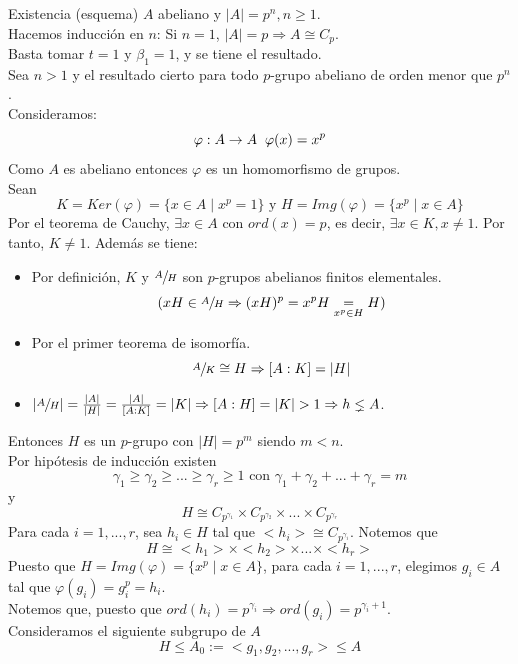 \documentclass[11pt,a4paper]{article}
\begin{document}
\begin{enumerate*}
\item[Existencia (esquema)] $A$ abeliano y $|A| = p^{n}, n \geq 1$. \\
Hacemos inducción en $n$: Si $n = 1$, $|A| = p \Rightarrow A \cong C_{p}$. \\
Basta tomar $t = 1$ y $\beta_{1} = 1$, y se tiene el resultado. \\
Sea $n > 1$ y el resultado cierto para todo $p$-grupo abeliano de orden menor que $p^{n}$. \\
Consideramos:
$$\varphi: A \to A \hspace{0.2cm} \varphi(x) = x^{p}$$
Como $A$ es abeliano entonces $\varphi$ es un homomorfismo de grupos. \\
Sean
$$K = Ker(\varphi) = \{x \in A \mid x^{p} = 1\} \text{ y } H = Img(\varphi) = \{x^{p} \mid x \in A\}$$
Por el teorema de Cauchy, $\exists x \in A$ con $ord(x) = p$, es decir, $\exists x \in K, x \neq 1$. Por tanto, $K \neq 1$. Además se tiene:
\begin{itemize}
\item Por definición, $K$ y $\sfrac{A}{H}$ son $p$-grupos abelianos finitos elementales.
$$(xH \in \sfrac{A}{H} \Rightarrow (xH)^{p} = x^{p}H \underset{x^{p} \in H}{=} H)$$
\item Por el primer teorema de isomorfía.
$$\sfrac{A}{K} \cong H \Rightarrow [A:K] = |H|$$
\item $|\sfrac{A}{H}| = \frac{|A|}{|H|} = \frac{|A|}{[A:K]} = |K| \Rightarrow [A:H] = |K| > 1 \Rightarrow h \lneq A$.
\end{itemize}
Entonces $H$ es un $p$-grupo con $|H| = p^{m}$ siendo $m < n$. \\
Por hipótesis de inducción existen
$$\gamma_{1} \geq \gamma_{2} \geq ... \geq \gamma_{r} \geq 1 \text{ con } \gamma_{1} + \gamma_{2} + ... + \gamma_{r} = m$$
y
$$H \cong C_{p^{\gamma_{1}}} \times C_{p^{\gamma_{2}}} \times ... \times C_{p^{\gamma_{r}}}$$
Para cada $i = 1, ..., r$, sea $h_{i} \in H$ tal que $<h_{i}> \cong C_{p^{\gamma_{i}}}$. Notemos que 
$$H \cong <h_{1}> \times <h_{2}> \times ... \times <h_{r}>$$
Puesto que $H = Img(\varphi) = \{x^{p} \mid x \in A\}$, para cada $i = 1, ..., r$, elegimos $g_{i} \in A$ tal que $\varphi(g_{i}) = g_{i}^{p} = h_{i}$. \\
Notemos que, puesto que $ord(h_{i}) = p^{\gamma_{i}} \Rightarrow ord(g_{i}) = p^{\gamma_{i}+1}$. \\
Consideramos el siguiente subgrupo de $A$
$$H \leqslant A_{0} := <g_{1}, g_{2}, ..., g_{r}> \leqslant A$$

\end{enumerate*}
\end{document}
